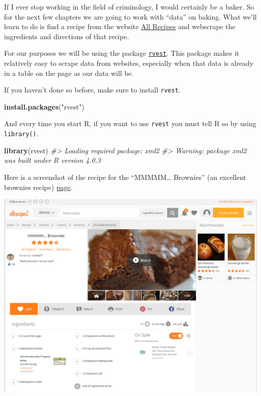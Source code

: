 \documentclass[
  12pt,
]{book}
\newenvironment{Shaded}{\begin{snugshade}}{\end{snugshade}}
\newcommand{\CommentTok}[1]{\textcolor[rgb]{0.37,0.37,0.37}{\textit{#1}}}
\newcommand{\KeywordTok}[1]{\textcolor[rgb]{0.27,0.27,0.27}{\textbf{#1}}}
\newcommand{\NormalTok}[1]{#1}
\newcommand{\StringTok}[1]{\textcolor[rgb]{0.5,0.5,0.5}{#1}}
\begin{document}
If I ever stop working in the field of criminology, I would certainly be a baker. So for the next few chapters we are going to work with ``data'' on baking. What we'll learn to do is find a recipe from the website \href{https://www.allrecipes.com/}{All Recipes} and webscrape the ingredients and directions of that recipe.

For our purposes we will be using the package \href{https://github.com/tidyverse/rvest}{\texttt{rvest}}. This package makes it relatively easy to scrape data from websites, especially when that data is already in a table on the page as our data will be.

If you haven't done so before, make sure to install \texttt{rvest}.

\begin{Shaded}
\begin{Highlighting}[]
\KeywordTok{install.packages}\NormalTok{(}\StringTok{"rvest"}\NormalTok{)}
\end{Highlighting}
\end{Shaded}

And every time you start R, if you want to use \texttt{rvest} you must tell R so by using \texttt{library()}.

\begin{Shaded}
\begin{Highlighting}[]
\KeywordTok{library}\NormalTok{(rvest)}
\CommentTok{\#\textgreater{} Loading required package: xml2}
\CommentTok{\#\textgreater{} Warning: package \textquotesingle{}xml2\textquotesingle{} was built under R version 4.0.3}
\end{Highlighting}
\end{Shaded}

Here is a screenshot of the recipe for the ``MMMMM\ldots{} Brownies'' (an excellent brownies recipe) \href{https://www.allrecipes.com/recipe/25080/mmmmm-brownies/?internalSource=hub\%20recipe\&referringContentType=Search}{page}.

\includegraphics{images/brownies_1.PNG}
\end{document}
